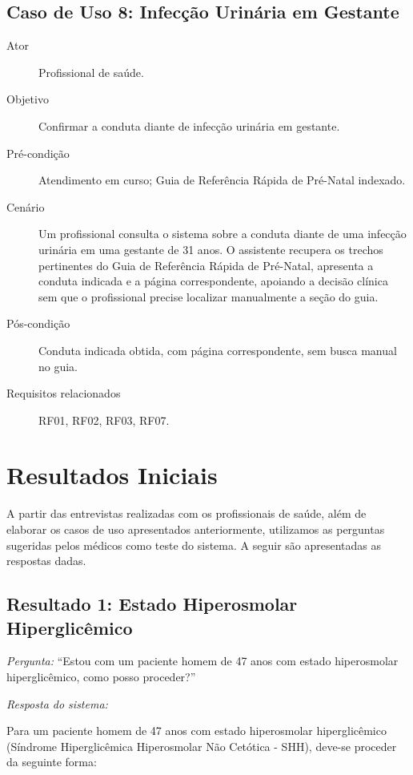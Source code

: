 \documentclass[conference,a4paper]{IEEEtran}
\begin{document}
\subsection{Caso de Uso 8: Infecção Urinária em Gestante}

\begin{description}
  \item[Ator] Profissional de saúde.
  \item[Objetivo] Confirmar a conduta diante de infecção urinária em gestante.
  \item[Pré-condição] Atendimento em curso; Guia de Referência Rápida de Pré-Natal indexado.
  \item[Cenário] Um profissional consulta o sistema sobre a conduta diante de uma infecção urinária em uma gestante de 31 anos. O assistente recupera os trechos pertinentes do Guia de Referência Rápida de Pré-Natal, apresenta a conduta indicada e a página correspondente, apoiando a decisão clínica sem que o profissional precise localizar manualmente a seção do guia.
  \item[Pós-condição] Conduta indicada obtida, com página correspondente, sem busca manual no guia.
  \item[Requisitos relacionados] RF01, RF02, RF03, RF07.
\end{description}


\section{Resultados Iniciais}
\label{sec:resultados}

A partir das entrevistas realizadas com os profissionais de
saúde, além de elaborar os casos de uso apresentados
anteriormente, utilizamos as perguntas sugeridas pelos médicos
como teste do sistema. A seguir são apresentadas as respostas
dadas.

\subsection{Resultado 1: Estado Hiperosmolar Hiperglicêmico}

\noindent\textit{Pergunta:} ``Estou com um paciente homem de 47
anos com estado hiperosmolar hiperglicêmico, como posso
proceder?''

\medskip
\noindent\textit{Resposta do sistema:}

Para um paciente homem de 47 anos com estado hiperosmolar
hiperglicêmico (Síndrome Hiperglicêmica Hiperosmolar Não
Cetótica - SHH), deve-se proceder da seguinte forma:
\end{document}
